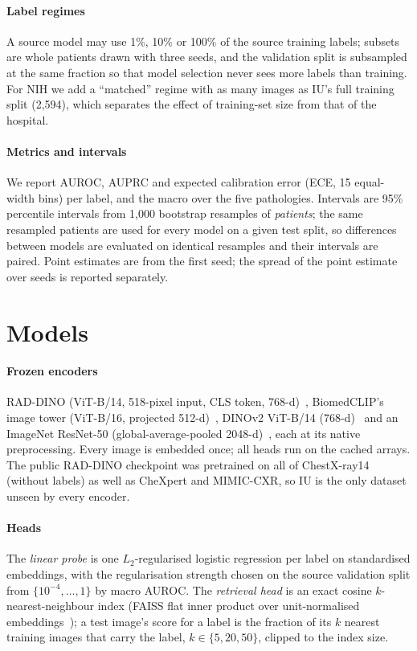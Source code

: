 \documentclass[conference]{IEEEtran}
\begin{document}
\paragraph{Label regimes}
A source model may use 1\%, 10\% or 100\% of the source training labels; subsets are whole patients drawn with three seeds, and the validation split is subsampled at the same fraction so that model selection never sees more labels than training. For NIH we add a ``matched'' regime with as many images as IU's full training split (2,594), which separates the effect of training-set size from that of the hospital.

\paragraph{Metrics and intervals}
We report AUROC, AUPRC and expected calibration error (ECE, 15 equal-width bins) per label, and the macro over the five pathologies. Intervals are 95\% percentile intervals from 1,000 bootstrap resamples of \emph{patients}; the same resampled patients are used for every model on a given test split, so differences between models are evaluated on identical resamples and their intervals are paired. Point estimates are from the first seed; the spread of the point estimate over seeds is reported separately.

\section{Models}

\paragraph{Frozen encoders}
RAD-DINO (ViT-B/14, 518-pixel input, CLS token, 768-d)~\cite{perezgarcia2025}, BiomedCLIP's image tower (ViT-B/16, projected 512-d)~\cite{zhang2025biomedclip}, DINOv2 ViT-B/14 (768-d)~\cite{oquab2024} and an ImageNet ResNet-50 (global-average-pooled 2048-d)~\cite{he2016}, each at its native preprocessing. Every image is embedded once; all heads run on the cached arrays. The public RAD-DINO checkpoint was pretrained on all of ChestX-ray14 (without labels) as well as CheXpert and MIMIC-CXR, so IU is the only dataset unseen by every encoder.

\paragraph{Heads}
The \emph{linear probe} is one $L_2$-regularised logistic regression per label on standardised embeddings, with the regularisation strength chosen on the source validation split from $\{10^{-4},\dots,1\}$ by macro AUROC. The \emph{retrieval head} is an exact cosine $k$-nearest-neighbour index (FAISS flat inner product over unit-normalised embeddings~\cite{johnson2019}); a test image's score for a label is the fraction of its $k$ nearest training images that carry the label, $k\in\{5,20,50\}$, clipped to the index size.
\end{document}
